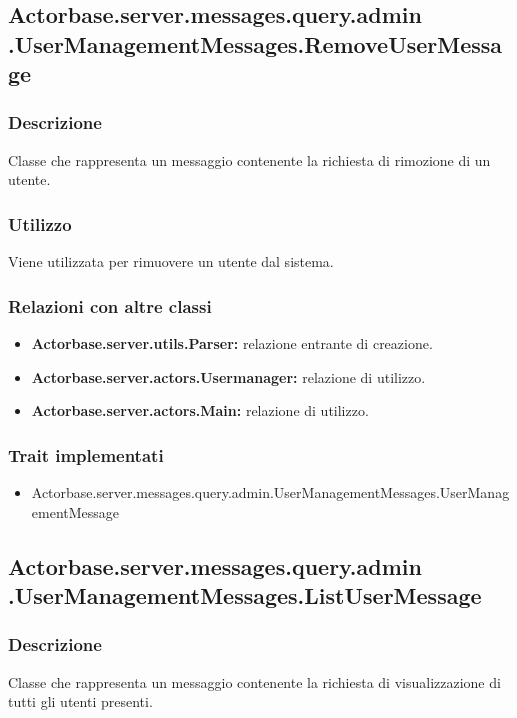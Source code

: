 \documentclass[a4paper]{article}
\begin{document}
		\subsection{Actorbase.server.messages.query.admin \newline
		.UserManagementMessages.RemoveUserMessage}
			\subsubsection{Descrizione}
				Classe che rappresenta un messaggio contenente la richiesta di rimozione di un utente.
				
			\subsubsection{Utilizzo}
				Viene utilizzata per rimuovere un utente dal sistema.
				
			\subsubsection{Relazioni con altre classi}
				\begin{itemize}
					\item \textbf{Actorbase.server.utils.Parser:} relazione entrante di creazione.
					\item \textbf{Actorbase.server.actors.Usermanager:} relazione di utilizzo.
					\item \textbf{Actorbase.server.actors.Main:} relazione di utilizzo.
				\end{itemize}
			\subsubsection{Trait implementati}
				\begin{itemize}
					\item Actorbase.server.messages.query.admin.UserManagementMessages.UserManagementMessage
				\end{itemize}
				
		\subsection{Actorbase.server.messages.query.admin \newline 
		.UserManagementMessages.ListUserMessage}
			\subsubsection{Descrizione}
				Classe che rappresenta un messaggio contenente la richiesta di visualizzazione di tutti gli utenti presenti.
				
\end{document}
